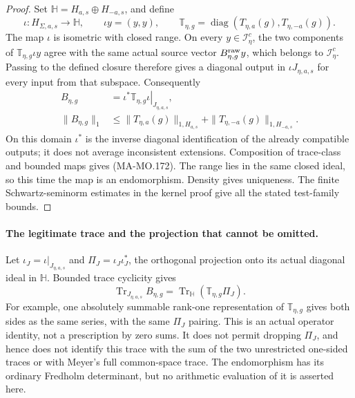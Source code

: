 \begin{proof}
Set \(\mathbb H=H_{a,s}\oplus H_{-a,s}\), and define
\[
 \iota:H_{\Sigma,a,s}\longrightarrow\mathbb H,
       \qquad\iota y=(y,y),\qquad
 \mathbb T_{\eta,g}
       =\operatorname{diag}(T_{\eta,a}(g),T_{\eta,-a}(g)).
 \tag{MA-MO.188}
\]
The map \(\iota\) is isometric with closed range.
On every \(y\in\mathscr I^c_\eta\), the two components
of \(\mathbb T_{\eta,g}\iota y\) agree with the same
actual source vector \(B^{\rm raw}_{\eta,g}y\), which
belongs to \(\mathscr I^c_\eta\). Passing to the defined
closure therefore gives a diagonal output in
\(\iota J_{\eta,a,s}\) for every input from that subspace.
Consequently
\[
 \begin{aligned}
 B_{\eta,g}&=\left.\iota^*\mathbb T_{\eta,g}\iota
                                           \right|_{J_{\eta,a,s}},\\
 \|B_{\eta,g}\|_1
       &\le\|T_{\eta,a}(g)\|_{1,H_{a,s}}
                         +\|T_{\eta,-a}(g)\|_{1,H_{-a,s}}.
 \end{aligned}
 \tag{MA-MO.189}
\]
On this domain \(\iota^*\) is the inverse diagonal
identification of the already compatible outputs; it
does not average inconsistent extensions. Composition
of trace-class and bounded maps gives (MA-MO.172).
The range lies in the same closed ideal, so this time
the map is an endomorphism. Density gives uniqueness.
The finite Schwartz-seminorm estimates in the kernel
proof give all the stated test-family bounds.
\end{proof}

\paragraph{The legitimate trace and the projection that cannot be omitted.}
Let \(\iota_J=\iota|_{J_{\eta,a,s}}\) and
\(\Pi_J=\iota_J\iota_J^*\), the orthogonal projection
onto its actual diagonal ideal in \(\mathbb H\).
Bounded trace cyclicity gives
\[
       \operatorname{Tr}_{J_{\eta,a,s}}B_{\eta,g}
          =\operatorname{Tr}_{\mathbb H}(\mathbb T_{\eta,g}\Pi_J).
 \tag{MA-MO.190}
\]
For example, one absolutely summable rank-one representation
of \(\mathbb T_{\eta,g}\) gives both sides as the same
series, with the same \(\Pi_J\) pairing. This is an
actual operator identity, not a prescription by zero sums.
It does not permit dropping \(\Pi_J\), and hence does
not identify this trace with the sum of the two unrestricted
one-sided traces or with Meyer's full common-space trace.
The endomorphism has its ordinary Fredholm determinant,
but no arithmetic evaluation of it is asserted here.


